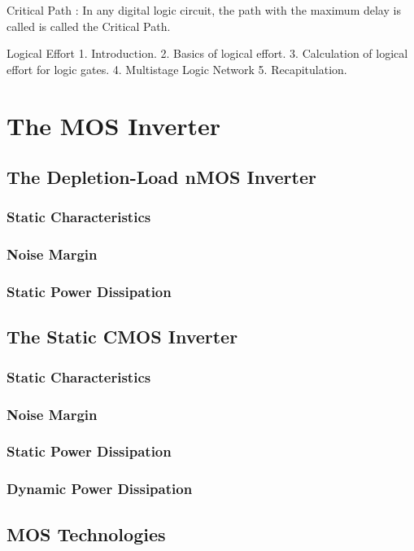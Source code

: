 \documentclass[12pt, letterpaper]{article}
\begin{document}
Critical Path : In any digital logic circuit, the path with the maximum delay is called is called the Critical Path.

									Logical Effort
1. Introduction.
2. Basics of logical effort.
3. Calculation of logical effort for logic gates.
4. Multistage Logic Network
5. Recapitulation. 




\section{The MOS Inverter}
\subsection{The Depletion-Load nMOS Inverter}
\subsubsection{Static Characteristics}
\subsubsection{Noise Margin}
\subsubsection{Static Power Dissipation}

\subsection{The Static CMOS Inverter}
\subsubsection{Static Characteristics}
\subsubsection{Noise Margin}
\subsubsection{Static Power Dissipation}
\subsubsection{Dynamic Power Dissipation}
\subsection{MOS Technologies}
\end{document}
